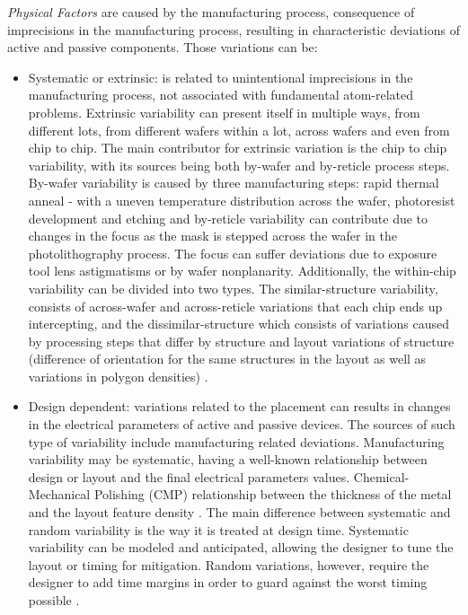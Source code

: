 \documentclass[pgmicro,mestrado,english]{iiufrgs}
\begin{document}
\textit{Physical Factors} are caused by the manufacturing process, consequence of imprecisions in the manufacturing process, resulting in characteristic deviations of active and passive components. Those variations can be:

    \begin{itemize}
        \item Systematic or extrinsic: is related to unintentional imprecisions in the manufacturing process, not associated with fundamental atom-related problems. Extrinsic variability can present itself in multiple ways, from different lots, from different wafers within a lot, across wafers and even from chip to chip. The main contributor for extrinsic variation is the chip to chip variability, with its sources being both by-wafer and by-reticle process steps. By-wafer variability is caused by three manufacturing steps: rapid thermal anneal - with a uneven temperature distribution across the wafer, photoresist development and etching and by-reticle variability can contribute due to changes in the focus as the mask is stepped across the wafer in the photolithography process. The focus can suffer deviations due to exposure tool lens astigmatisms or by wafer nonplanarity. Additionally, the within-chip variability can be divided into two types. The similar-structure variability, consists of across-wafer and across-reticle variations that each chip ends up intercepting, and the dissimilar-structure which consists of variations caused by processing steps that differ by structure and layout variations of structure (difference of orientation for the same structures in the layout as well as variations in polygon densities) \cite{bernstein2006high}.

        \item Design dependent: variations related to the placement can results in changes in the electrical parameters of active and passive devices. The sources of such type of variability include manufacturing related deviations. Manufacturing variability may be systematic, having a well-known relationship between design or layout and the final electrical parameters values. Chemical-Mechanical Polishing (CMP) relationship between the thickness of the metal and the layout feature density \cite{stine1997analysis}. The main difference between systematic and random variability is the way it is treated at design time. Systematic variability can be modeled and anticipated, allowing the designer to tune the layout or timing for mitigation. Random variations, however, require the designer to add time margins in order to guard against the worst timing possible \cite{nassif1998within}.


\end{itemize}
\end{document}
